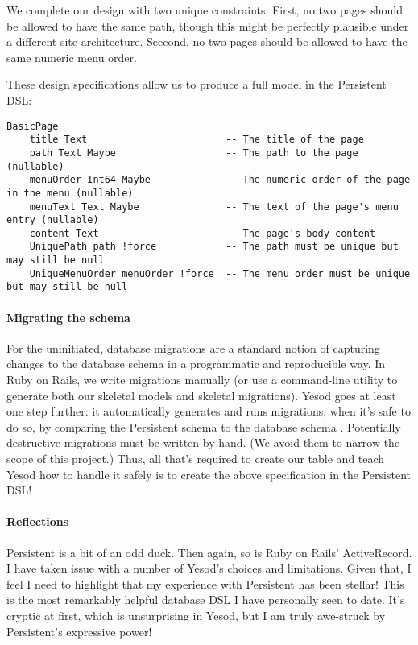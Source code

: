 We complete our design with two unique constraints. First, no two pages should be allowed to have the same path, though this might be perfectly plausible under a different site architecture. Seecond, no two pages should be allowed to have the same numeric menu order.

These design specifications allow us to produce a full model in the Persistent DSL:

\begin{Verbatim}[samepage=true]
BasicPage
    title Text                        -- The title of the page
    path Text Maybe                   -- The path to the page (nullable)
    menuOrder Int64 Maybe             -- The numeric order of the page in the menu (nullable)
    menuText Text Maybe               -- The text of the page's menu entry (nullable)
    content Text                      -- The page's body content
    UniquePath path !force            -- The path must be unique but may still be null
    UniqueMenuOrder menuOrder !force  -- The menu order must be unique but may still be null
\end{Verbatim}

\paragraph{Migrating the schema} For the uninitiated, database migrations are a standard notion of capturing changes to the database schema in a programmatic and reproducible way. In Ruby on Rails, we write migrations manually (or use a command-line utility to generate both our skeletal models and skeletal migrations). Yesod goes at least one step further: it automatically generates and runs migrations, when it's safe to do so, by comparing the Persistent schema to the database schema \cite{ybkPersistent}. Potentially destructive migrations must be written by hand. (We avoid them to narrow the scope of this project.) Thus, all that's required to create our table and teach Yesod how to handle it safely is to create the above specification in the Persistent DSL!

\paragraph{Reflections} Persistent is a bit of an odd duck. Then again, so is Ruby on Rails' ActiveRecord. I have taken issue with a number of Yesod's choices and limitations. Given that, I feel I need to highlight that my experience with Persistent has been stellar! This is the most remarkably helpful database DSL I have personally seen to date. It's cryptic at first, which is unsurprising in Yesod, but I am truly awe-struck by Persistent's expressive power!

